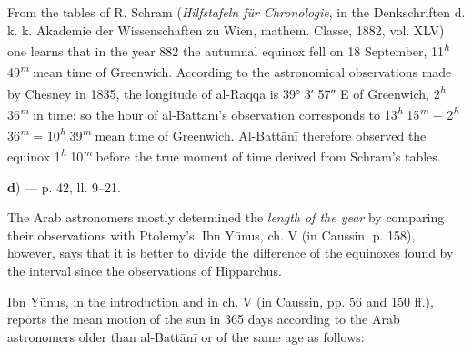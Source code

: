 \documentclass[11pt]{article}
\newcommand{\Pg}[1]{\marginpar{\footnotesize\color{gray}#1}}
\begin{document}
\par From the tables of R. Schram (\emph{Hilfstafeln für Chronologie}, in the Denkschriften d. k. k. Akademie der Wissenschaften zu Wien, mathem. Classe, 1882, vol. XLV) one learns that in the year 882 the autumnal equinox fell on 18 September, 11\textsuperscript{\itshape h} 49\textsuperscript{\itshape m} mean time of Greenwich. According to the astronomical observations made by Chesney in 1835, the longitude of al-Raqqa is 39° 3′ 57″ E of Greenwich, 2\textsuperscript{\itshape h} 36\textsuperscript{\itshape m} in time; so the hour of al-Battānī's observation corresponds to 13\textsuperscript{\itshape h} 15\textsuperscript{\itshape m} − 2\textsuperscript{\itshape h} 36\textsuperscript{\itshape m} = 10\textsuperscript{\itshape h} 39\textsuperscript{\itshape m} mean time of Greenwich. Al-Battānī therefore observed the equinox 1\textsuperscript{\itshape h} 10\textsuperscript{\itshape m} before the true moment of time derived from Schram's tables.\par
\par [If we consider the astronomical instruments of that age, al-Battānī's observation must be judged excellent. Without doubt al-Battānī used the long alidade or the brick (the triquetrum and the mural quadrant), which are described in the last chapter of the book, or perhaps a very tall and most accurately made gnomon, to measure the meridian altitude of the sun on the days before and after the equinox; by making a proportion between the two measurements he could compute the moment of time between those two noons at which the meridian altitude of the sun would have been equal to the altitude of the celestial equator (or, as al-Battānī often says, to the altitude of the beginning of Aries) in the city of al-Raqqa (= 90° − the latitude of the city). Astronomers today, too, work in a similar way. — Schiaparelli.]\par
\par\begin{center}\textbf{d}) — p. 42, ll. 9–21.\end{center}
\par The Arab astronomers mostly determined the \emph{length of the year} by comparing their observations with Ptolemy's. Ibn Yūnus, ch. V (in Caussin, p. 158), however, says that it is better to divide the difference of the equinoxes found by the interval since the observations of Hipparchus.\par
\par \Pg{I 211}Ibn Yūnus, in the introduction and in ch. V (in Caussin, pp. 56 and 150 ff.), reports the mean motion of the sun in 365 days according to the Arab astronomers older than al-Battānī or of the same age as follows:\par
\end{document}
